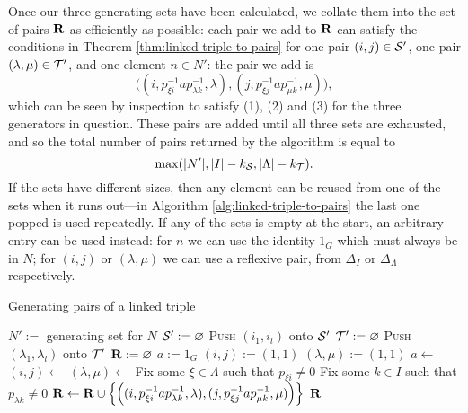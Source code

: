 Once our three generating sets have been calculated, we collate them into the
set of pairs $\mathbf{R}$ as efficiently as possible: each pair we add to $\mathbf{R}$ can
satisfy the conditions in Theorem \ref{thm:linked-triple-to-pairs} for one pair
$(i,j) \in \mathcal{S}'$, one pair $(\lambda, \mu) \in \mathcal{T}'$, and one element
$n \in N'$: the pair we add is
$$\big((i, p_{\xi i}^{-1}ap_{\lambda k}^{-1}, \lambda),
(j, p_{\xi j}^{-1}ap_{\mu k}^{-1}, \mu)\big),$$
which can be seen by inspection to satisfy (1), (2) and (3) for the three
generators in question.  These pairs are added until all three sets are
exhausted, and so the total number of pairs returned by the algorithm is equal
to
$$\max(|N'|, |I| - k_{\mathcal{S}}, |\Lambda| - k_{\mathcal{T}}).$$
If the sets have different sizes, then any element can be reused from one of
the sets when it runs out---in Algorithm \ref{alg:linked-triple-to-pairs} the
last one popped is used repeatedly.  If any of the sets is empty at the
start, an arbitrary entry can be used instead: for $n$ we can use the identity
$1_G$ which must always be in $N$; for $(i,j)$ or $(\lambda,\mu)$ we can use a
reflexive pair, from $\Delta_I$ or $\Delta_\Lambda$ respectively.

\begin{algorithm}
\caption{Generating pairs of a linked triple}
\label{alg:linked-triple-to-pairs}
\begin{algorithmic}[1]
    \State $N' := $ generating set for $N$
    \State $\mathcal{S}' := \varnothing$
        \State \textsc{Push} $(i_1, i_l)$ onto $\mathcal{S}'$
      \EndFor
    \EndFor
    \State $\mathcal{T}' := \varnothing$
        \State \textsc{Push} $(\lambda_1, \lambda_l)$ onto $\mathcal{T}'$
      \EndFor
    \EndFor
    \State $\mathbf{R} := \varnothing$
    \State $a := 1_G$
    \State $(i,j) := (1,1)$
    \State $(\lambda,\mu) := (1,1)$
        \State $a \gets$ 
      \EndIf
        \State $(i,j) \gets$ 
      \EndIf
        \State $(\lambda, \mu) \gets$ 
      \EndIf
      \State Fix some $\xi \in \Lambda$ such that $p_{\xi i} \neq 0$
      \State Fix some $k \in I$ such that $p_{\lambda k} \neq 0$
      \State $\mathbf{R} \gets \mathbf{R} \cup \left\{\left(
        (i, p_{\xi i}^{-1}ap_{\lambda k}^{-1}, \lambda),
        (j, p_{\xi j}^{-1}ap_{\mu k}^{-1}, \mu)
        \right)\right\}$
    \EndWhile
    \State \Return $\mathbf{R}$
  \EndProcedure
\end{algorithmic}
\end{algorithm}

